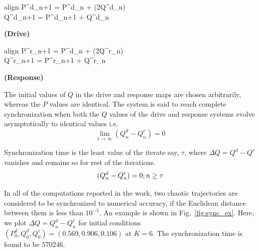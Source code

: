 \documentclass[reprint,superscriptaddress,amsmath,amssymb,aps,pre]{revtex4-1}
\begin{document}
\begin{minipage}[t]{0.5\textwidth}
	\begin{empheq}[right=\empheqrbrace \mod 1]{align}\nonumber
	\label{equ:drive}
	P^d_{n+1} = P^d_n + \sin(2\pi Q^d_n)\nonumber\\
	Q^d_{n+1} = P^d_{n+1} + Q^d_n \nonumber
	\end{empheq}
	\centering \textbf{(Drive)}
	
\end{minipage}
\begin{minipage}[t]{0.5\textwidth}
	\begin{empheq}[right=\empheqrbrace \mod 1]{align}
	P^r_{n+1} = P^d_n + \sin(2\pi Q^r_n) \nonumber \\
	Q^r_{n+1} = P^r_{n+1} + Q^r_n \nonumber
	\end{empheq}
	\centering \textbf{(Response)}
\end{minipage}

\vspace{.5cm}

The initial values of $Q$ in the drive and response maps are chosen arbitrarily, whereas the $P$ values are identical. The system is said to reach complete synchronization when both the $Q$ values of the drive and response systems evolve asymptotically to identical values i.e. 
\begin{equation}
\lim_{t\rightarrow\infty}(Q^d_n - Q^r_n) = 0
\end{equation}

Synchronization time is the least value of the iterate say, $\tau$, where $\Delta Q = Q^d-Q^r$ vanishes and remains so for rest of the iterations. 
\begin{equation}
(Q^d_n - Q^r_n) = 0; \hfill  n \geq  \bf {\tau }
\end{equation}

In all of the computations reported in the work, two chaotic trajectories are considered to be synchronized to numerical accuracy, if the Euclidean distance between them is less than $10^{-5}$. An example is shown in Fig.~\ref{fig:sync_ex}. Here, we plot $\Delta Q = Q^d_n-Q^r_n$ for initial conditions $(P^d_0,Q^d_0,Q^r_0) = (0.569, 0.906,0.106)$ at $K = 6$. The synchronization time is found to be 570246. 
\end{document}
